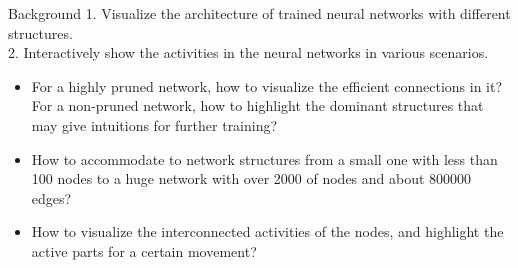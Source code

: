 \documentclass[final,hyperref={pdfpagelabels=false}]{beamer}
\begin{document}
\begin{frame}{}
\begin{columns}[t]
\begin{column}{.3\linewidth}
\begin{block}{Background}
1. Visualize the architecture of trained neural networks with different structures. \\

2. Interactively show the activities in the neural networks in various scenarios. \\
\bigskip

\begin{itemize}
\item For a highly pruned network, how to visualize the efficient connections in it? For a non-pruned network, how to highlight the dominant structures that may give intuitions for further training?

\item How to accommodate to network structures from a small one with less than 100 nodes to a huge network with over 2000 of nodes and about 800000 edges? 

\item How to visualize the interconnected activities of the nodes, and highlight the active parts for a certain movement?

\bigskip
\bigskip
\bigskip
\bigskip

\end{itemize}
   \end{block}

    \vfill
   \end{column}


\end{columns}
\end{frame}
\end{document}
